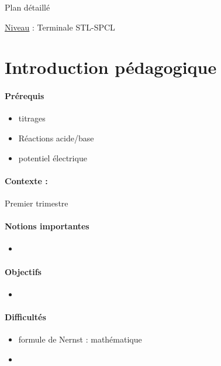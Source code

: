 \begin{reportBlock}{Plan détaillé}

\underline{Niveau} : Terminale STL-SPCL \\

\section*{Introduction pédagogique}

\paragraph*{Prérequis}
\begin{itemize}
\item titrages
\item Réactions acide/base
\item potentiel électrique
\end{itemize}

\paragraph*{Contexte :}
Premier trimestre 


\paragraph*{Notions importantes}

\begin{itemize}
\item 
\end{itemize}

\paragraph*{Objectifs}

\begin{itemize}
\item 
\end{itemize}

\paragraph*{Difficultés}

\begin{itemize}
\item formule de Nernst : mathématique
\item 

\end{itemize}


\end{reportBlock}
